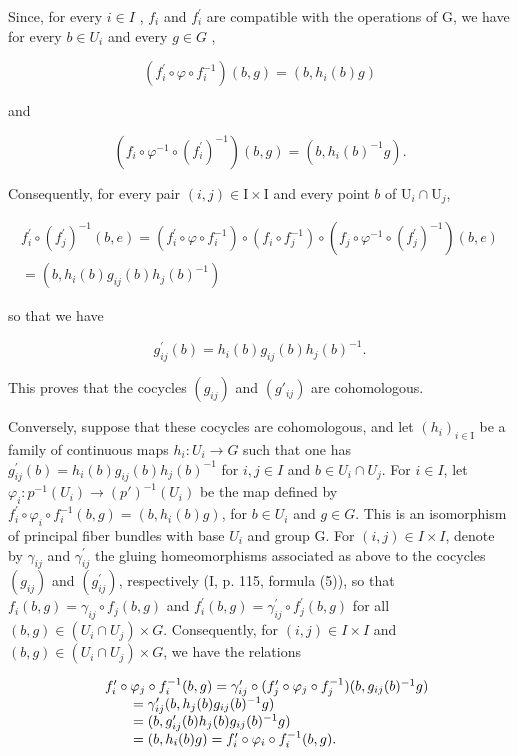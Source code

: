 Since, for every \(i \in I\) , \(f_{i}\) and \(f_{i}^{\prime}\) are compatible with the operations of G, we have for every \(b \in U_{i}\) and every \(g \in G\) ,

\[
(f _ {i} ^ {\prime} \circ \varphi \circ f _ {i} ^ {- 1}) (b, g) = (b, h _ {i} (b) g)
\]

and

\[
(f _ {i} \circ \varphi^ {- 1} \circ (f _ {i} ^ {\prime}) ^ {- 1}) (b, g) = (b, h _ {i} (b) ^ {- 1} g).
\]

Consequently, for every pair \((i,j)\in \mathrm{I}\times \mathrm{I}\) and every point \(b\) of \(\mathrm{U}_i\cap \mathrm{U}_j\),

\[
\begin{array}{c} f _ {i} ^ {\prime} \circ (f _ {j} ^ {\prime}) ^ {- 1} (b, e) = (f _ {i} ^ {\prime} \circ \varphi \circ f _ {i} ^ {- 1}) \circ (f _ {i} \circ f _ {j} ^ {- 1}) \circ (f _ {j} \circ \varphi^ {- 1} \circ (f _ {j} ^ {\prime}) ^ {- 1}) (b, e) \\ = (b, h _ {i} (b) g _ {i j} (b) h _ {j} (b) ^ {- 1}) \end{array}
\]

so that we have

\[
g _ {i j} ^ {\prime} (b) = h _ {i} (b) g _ {i j} (b) h _ {j} (b) ^ {- 1}.
\]

This proves that the cocycles \((g_{ij})\) and \((g'_{ij})\) are cohomologous.

Conversely, suppose that these cocycles are cohomologous, and let \((h_{i})_{i\in\mathrm{I}}\) be a family of continuous maps \(h_{i}\colon U_{i}\to G\) such that one has \(g_{ij}^{\prime}(b)=h_{i}(b)g_{ij}(b)h_{j}(b)^{-1}\) for \(i,j\in I\) and \(b\in U_{i}\cap U_{j}\). For \(i\in I\), let \(\varphi_{i}\colon p^{-1}(U_{i})\to(p')^{-1}(U_{i})\) be the map defined by \(f_{i}^{\prime}\circ\varphi_{i}\circ f_{i}^{-1}(b,g)=(b,h_{i}(b)g)\), for \(b\in U_{i}\) and \(g\in G\). This is an isomorphism of principal fiber bundles with base \(U_{i}\) and group G. For \((i,j)\in I\times I\), denote by \(\gamma_{ij}\) and \(\gamma_{ij}^{\prime}\) the gluing homeomorphisms associated as above to the cocycles \((g_{ij})\) and \((g_{ij}^{\prime})\), respectively (I, p. 115, formula (5)), so that \(f_{i}(b,g)=\gamma_{ij}\circ f_{j}(b,g)\) and \(f_{i}^{\prime}(b,g)=\gamma_{ij}^{\prime}\circ f_{j}^{\prime}(b,g)\) for all \((b,g)\in(U_{i}\cap U_{j})\times G\). Consequently, for \((i,j)\in I\times I\) and \((b,g)\in(U_{i}\cap U_{j})\times G\), we have the relations

\[
\begin{array}{r l} & f _ {i} ^ {\prime} \circ \varphi_ {j} \circ f _ {i} ^ {- 1} (b, g) = \gamma_ {i j} ^ {\prime} \circ (f _ {j} ^ {\prime} \circ \varphi_ {j} \circ f _ {j} ^ {- 1}) (b, g _ {i j} (b) ^ {- 1} g) \\ & \qquad = \gamma_ {i j} ^ {\prime} (b, h _ {j} (b) g _ {i j} (b) ^ {- 1} g) \\ & \qquad = (b, g _ {i j} ^ {\prime} (b) h _ {j} (b) g _ {i j} (b) ^ {- 1} g) \\ & \qquad = (b, h _ {i} (b) g) = f _ {i} ^ {\prime} \circ \varphi_ {i} \circ f _ {i} ^ {- 1} (b, g). \end{array}
\]

